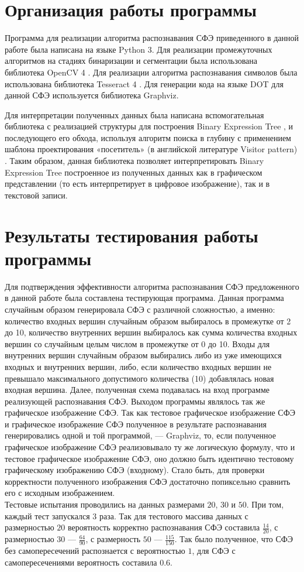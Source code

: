 \documentclass[makeidx, a4paper, 14pt]{extarticle}
\begin{document}
\section{Организация работы программы}
Программа для реализации алгоритма распознавания СФЭ приведенного в данной работе была написана на языке Python 3.
Для реализации промежуточных алгоритмов на стадиях бинаризации и сегментации была использована библиотека OpenCV 4 \cite{opencv4}.
Для реализации алгоритма распознавания символов была использована библиотека Tesseract 4 \cite{tesseract}. Для генерации кода на языке DOT для данной СФЭ
используется библиотека Graphviz.

Для интерпретации полученных данных была написана вспомогательная библиотека с реализацией структуры для построения Binary Expression Tree \cite{binary_tree},
и последующего его обхода, используя алгоритм поиска в глубину \cite{dfs} с применением шаблона проектирования «посетитель» (в английской литературе Visitor pattern) \cite{visitor}.
Таким образом, данная библиотека позволяет интерпретировать Binary Expression Tree построенное из полученных данных как в графическом представлении (то есть интерпретирует в цифровое изображение),
так и в текстовой записи.

\section{Результаты тестирования работы программы}
Для подтверждения эффективности алгоритма распознавания СФЭ предложенного в данной работе была составлена тестирующая программа. Данная программа случайным образом
генерировала СФЭ с различной сложностью, а именно: количество входных вершин случайным образом выбиралось в промежутке от 2 до 10, количество внутренних вершин
выбиралось как сумма количества входных вершин со случайным целым числом в промежутке от 0 до 10. Входы для внутренних вершин случайным образом выбирались либо из уже имеющихся входных и внутренних вершин, либо,
если количество входных вершин не превышало максимального допустимого количества (10) добавлялась новая входная вершина. Далее, полученная схема подавалась на вход программе реализующей распознавания СФЭ.
Выходом программы являлось так же графическое изображение СФЭ. Так как тестовое графическое изображение СФЭ и графическое изображение СФЭ полученное в результате распознавания генерировались одной и той программой, --- Graphviz,
то, если полученное графическое изображение СФЭ реализовывало ту же логическую формулу, что и тестовое графическое изображение СФЭ, оно должно быть идентично тестовому графическому изображению СФЭ (входному).
Стало быть, для проверки корректности полученного изображения СФЭ достаточно попиксельно сравнить его с исходным изображением. \\
Тестовые испытания проводились на данных размерами $20$, $30$ и $50$. При том, каждый тест запускался 3 раза. Так для тестового массива данных с размерностью $20$ вероятность корректно распознавания СФЭ составила $\frac{14}{20}$,
с размерностью $30$ --- $\frac{64}{90}$, с размерность $50$ --- $\frac{115}{150}$.
Так было полученное, что СФЭ без самопересечений распознается с вероятностью $1$, для СФЭ с самопересечениями вероятность составила $0.6$. \\
\end{document}
